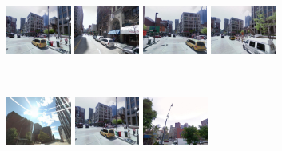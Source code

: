 \documentclass[10pt,twocolumn,letterpaper]{article}
\begin{document}
\begin{figure}[t!]
\begin{minipage}{0.34\linewidth}
            \end{minipage}
            \begin{minipage}{0.75\linewidth}
               \begin{minipage}{\linewidth} 
                   \colorbox{myGreen}{\includegraphics[height=16mm]{imgs/ex3/FVsvm1.jpg}}
                   \colorbox{myRed}{\includegraphics[height=16mm]{imgs/ex3/FVsvm2.jpg}}
                   \colorbox{myGreen}{\includegraphics[height=16mm]{imgs/ex3/FVsvm5.jpg}}
                   \colorbox{myGreen}{\includegraphics[height=16mm]{imgs/ex3/FVsvm4.jpg}}
               \end{minipage}
               \\
               \begin{minipage}{\linewidth}
                   \colorbox{myRed}{\includegraphics[height=16mm]{imgs/ex3/FV1.jpg}}
                   \colorbox{myGreen}{\includegraphics[height=16mm]{imgs/ex3/FV2.jpg}}
                   \colorbox{myRed}{\includegraphics[height=16mm]{imgs/ex3/FV3.jpg}}

\end{minipage}
\end{minipage}
\end{figure}
\end{document}
